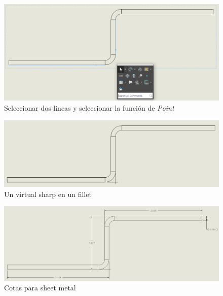\documentclass[12pt,letterpaper,final]{report}
\begin{document}
\begin{figure}[H]
	\centering
	\includegraphics[width=0.95\linewidth, height=0.5\textheight,keepaspectratio]{Imagenes/solidworks_virtual_sharps01}
	\caption{Seleccionar dos lineas y seleccionar la función de \emph{Point}}
	\label{fig:solidworksvirtualsharps01}
\end{figure}

\begin{figure}[H]
	\centering
	\includegraphics[width=0.95\linewidth, height=0.5\textheight,keepaspectratio]{Imagenes/solidworks_virtual_sharps02}
	\caption{Un virtual sharp en un fillet}
	\label{fig:solidworksvirtualsharps02}
\end{figure}


\begin{figure}[H]
	\centering
	\includegraphics[width=0.95\linewidth, height=0.5\textheight,keepaspectratio]{Imagenes/solidworks_virtual_sharps03}
	\caption{Cotas para sheet metal}
	\label{fig:solidworksvirtualsharps03}
\end{figure}
\end{document}
